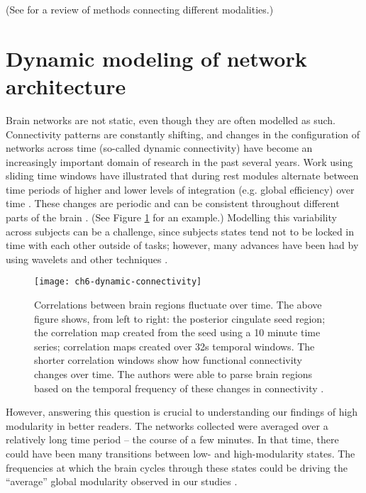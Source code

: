  (See \citep{Sui2012} for a review of methods connecting different modalities.)

\section{Dynamic modeling of network architecture}

Brain networks are not static, even though they are often modelled as such. Connectivity patterns are constantly shifting, and changes in the configuration of networks across time (so-called dynamic connectivity) have become an increasingly important domain of research in the past several years. Work using sliding time windows have illustrated that during rest modules alternate between time periods of higher and lower levels of integration (e.g. global efficiency) over time \citep{Zalesky2014}. These changes are periodic and can be consistent throughout different parts of the brain \citep{Handwerker2012}. (See Figure \ref{fig:ch6-dynamic-connectivity} for an example.) Modelling this variability across subjects can be a challenge, since subjects states tend not to be locked in time with each other outside of tasks; however, many advances have been had by using wavelets and other techniques \citep{Zalesky2014}. 

\begin{figure}[t]
	\centering
	\texttt{[image: ch6-dynamic-connectivity]}
	\caption[Correlations between brain regions fluctuate over time.]{Correlations between brain regions fluctuate over time. The above figure shows, from left to right: the posterior cingulate seed region; the correlation map created from the seed using a 10 minute time series; correlation maps created over 32s temporal windows. The shorter correlation windows show how functional connectivity changes over time. The authors were able to parse brain regions based on the temporal frequency of these changes in connectivity \citep{Handwerker2012}.}
	\label{fig:ch6-dynamic-connectivity}
\end{figure}

However, answering this question is crucial to understanding our findings of high modularity in better readers. The networks collected were averaged over a relatively long time period -- the course of a few minutes. In that time, there could have been many transitions between low- and high-modularity states. The frequencies at which the brain cycles through these states could be driving the ``average'' global modularity observed in our studies \citep{Fries2005}.

